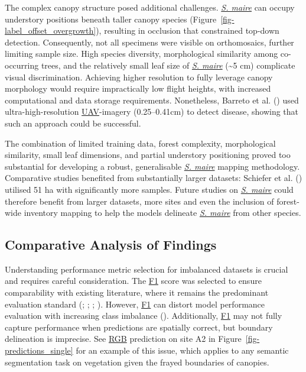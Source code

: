 \documentclass[
]{scrreprt}
\begin{document}
The complex canopy structure posed additional challenges.
\hyperref[acronyms_SM]{\emph{S. maire}} can occupy understory positions
beneath taller canopy species
(Figure~\ref{fig-label_offset_overgrowth}), resulting in occlusion that
constrained top-down detection. Consequently, not all specimens were
visible on orthomosaics, further limiting sample size. High species
diversity, morphological similarity among co-occurring trees, and the
relatively small leaf size of \hyperref[acronyms_SM]{\emph{S. maire}}
(\textasciitilde5 cm) complicate visual discrimination. Achieving higher
resolution to fully leverage canopy morphology would require
impractically low flight heights, with increased computational and data
storage requirements. Nonetheless, Barreto et al.
() used
ultra-high-resolution \hyperref[acronyms_UAV]{UAV}-imagery
(0.25--0.41cm) to detect disease, showing that such an approach could be
successful.

The combination of limited training data, forest complexity,
morphological similarity, small leaf dimensions, and partial understory
positioning proved too substantial for developing a robust,
generalisable \hyperref[acronyms_SM]{\emph{S. maire}} mapping
methodology. Comparative studies benefited from substantially larger
datasets: Schiefer et al.
() utilised 51 ha with
significantly more samples. Future studies on
\hyperref[acronyms_SM]{\emph{S. maire}} could therefore benefit from
larger datasets, more sites and even the inclusion of forest-wide
inventory mapping to help the models delineate
\hyperref[acronyms_SM]{\emph{S. maire}} from other species.

\subsection{Comparative Analysis of
Findings}\label{comparative-analysis-of-findings}

Understanding performance metric selection for imbalanced datasets is
crucial and requires careful consideration. The
\hyperref[acronyms_F1]{F1} score was selected to ensure comparability
with existing literature, where it remains the predominant evaluation
standard (;
;
;
). However,
\hyperref[acronyms_F1]{F1} can distort model performance evaluation with
increasing class imbalance
().
Additionally, \hyperref[acronyms_F1]{F1} may not fully capture
performance when predictions are spatially correct, but boundary
delineation is imprecise. See \hyperref[acronyms_RGB]{RGB} prediction on
site A2 in Figure~\ref{fig-predictions_single} for an example of this
issue, which applies to any semantic segmentation task on vegetation
given the frayed boundaries of canopies.
\end{document}
